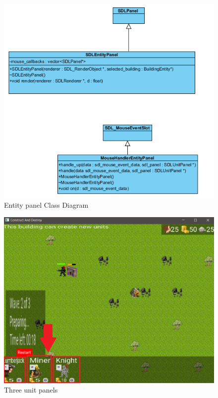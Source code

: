 \begin{figure}
    \centering
    \includegraphics[scale=0.8]{res/entity-panel-class-diagram.png}
    \caption{Entity panel Class Diagram}\label{fig:entity-panel-class-diagram}
\end{figure}

\begin{figure}
    \centering
    \includegraphics[scale=0.7]{res/unit-panel.png}
    \caption{Three unit panels}\label{fig:unit-panel}
\end{figure}

